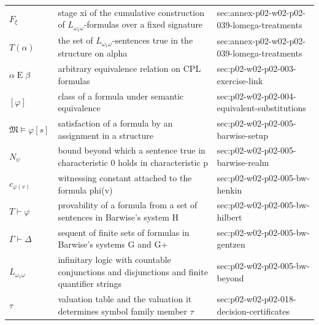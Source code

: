 \begin{longtable}{@{}p{}p{}p{}@{}}
\(F_\xi\) & stage xi of the cumulative construction of \(L_{\omega_1\omega}\)-formulas over a fixed signature & sec:\allowbreak{}annex-\allowbreak{}p02-\allowbreak{}w02-\allowbreak{}p02-\allowbreak{}039-\allowbreak{}lomega-\allowbreak{}treatments \\
\(T(\alpha)\) & the set of \(L_{\omega_1\omega}\)-sentences true in the structure on alpha & sec:\allowbreak{}annex-\allowbreak{}p02-\allowbreak{}w02-\allowbreak{}p02-\allowbreak{}039-\allowbreak{}lomega-\allowbreak{}treatments \\
\(\alpha\mathrel{E}\beta\) & arbitrary equivalence relation on CPL formulas & sec:\allowbreak{}p02-\allowbreak{}w02-\allowbreak{}p02-\allowbreak{}003-\allowbreak{}exercise-\allowbreak{}link \\
\([\varphi]\) & class of a formula under semantic equivalence & sec:\allowbreak{}p02-\allowbreak{}w02-\allowbreak{}p02-\allowbreak{}004-\allowbreak{}equivalent-\allowbreak{}substitutions \\
\(\mathfrak M\models\varphi[s]\) & satisfaction of a formula by an assignment in a structure & sec:\allowbreak{}p02-\allowbreak{}w02-\allowbreak{}p02-\allowbreak{}005-\allowbreak{}barwise-\allowbreak{}setup \\
\(N_\psi\) & bound beyond which a sentence true in characteristic 0 holds in characteristic p & sec:\allowbreak{}p02-\allowbreak{}w02-\allowbreak{}p02-\allowbreak{}005-\allowbreak{}barwise-\allowbreak{}realm \\
\(c_{\varphi(v)}\) & witnessing constant attached to the formula phi(v) & sec:\allowbreak{}p02-\allowbreak{}w02-\allowbreak{}p02-\allowbreak{}005-\allowbreak{}bw-\allowbreak{}henkin \\
\(T\vdash\varphi\) & provability of a formula from a set of sentences in Barwise's system H & sec:\allowbreak{}p02-\allowbreak{}w02-\allowbreak{}p02-\allowbreak{}005-\allowbreak{}bw-\allowbreak{}hilbert \\
\(\Gamma\vdash\Delta\) & sequent of finite sets of formulas in Barwise's systems G and G+ & sec:\allowbreak{}p02-\allowbreak{}w02-\allowbreak{}p02-\allowbreak{}005-\allowbreak{}bw-\allowbreak{}gentzen \\
\(L_{\omega_1\omega}\) & infinitary logic with countable conjunctions and disjunctions and finite quantifier strings & sec:\allowbreak{}p02-\allowbreak{}w02-\allowbreak{}p02-\allowbreak{}005-\allowbreak{}bw-\allowbreak{}beyond \\
\(\tau\) & valuation table and the valuation it determines symbol family member \(\tau\) & sec:\allowbreak{}p02-\allowbreak{}w02-\allowbreak{}p02-\allowbreak{}018-\allowbreak{}decision-\allowbreak{}certificates \\

\end{longtable}
